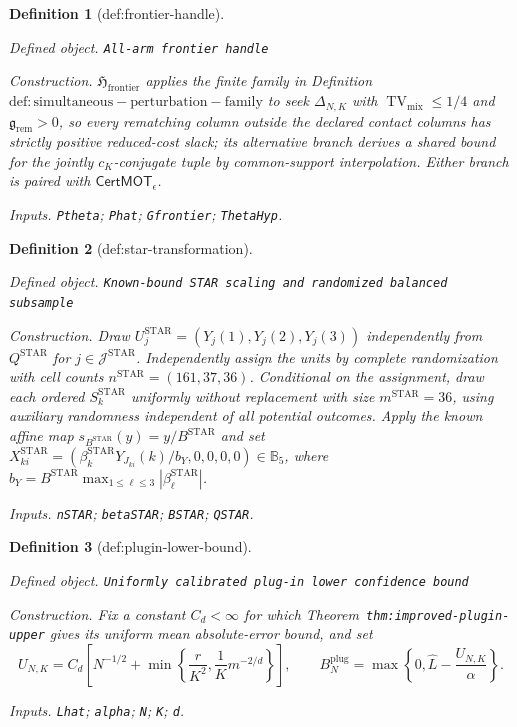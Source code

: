 \documentclass{article}
\newtheorem{definition}{Definition}
\begin{document}
\begin{definition}[def:frontier-handle]\label{def:frontier-handle}
\par\smallskip\noindent\emph{Defined object.} \texttt{All-\allowbreak{}arm frontier handle}
\par\smallskip\noindent\emph{Construction.} \(\mathfrak H_{\mathrm{frontier}}\) applies the finite family in Definition \(\mathrm{def:simultaneous-perturbation-family}\) to seek \(\Delta_{N,K}\) with \(\operatorname{TV}_{\mathrm{mix}}\le1/4\) and \(\mathfrak g_{\mathrm{rem}}>0\), so every rematching column outside the declared contact columns has strictly positive reduced-cost slack; its alternative branch derives a shared bound for the jointly \(c_K\)-conjugate tuple by common-support interpolation. Either branch is paired with \(\mathsf{CertMOT}_\epsilon\).
\par\smallskip\noindent\emph{Inputs.} \texttt{Ptheta}; \texttt{Phat}; \texttt{Gfrontier}; \texttt{ThetaHyp}.
\end{definition}

\begin{definition}[def:star-transformation]\label{def:star-transformation}
\par\smallskip\noindent\emph{Defined object.} \texttt{Known-\allowbreak{}bound STAR scaling and randomized balanced subsample}
\par\smallskip\noindent\emph{Construction.} Draw \(U_j^{\mathrm{STAR}}=(Y_j(1),Y_j(2),Y_j(3))\) independently from \(Q^{\mathrm{STAR}}\) for \(j\in\mathcal J^{\mathrm{STAR}}\). Independently assign the units by complete randomization with cell counts \(n^{\mathrm{STAR}}=(161,37,36)\). Conditional on the assignment, draw each ordered \(S_k^{\mathrm{STAR}}\) uniformly without replacement with size \(m^{\mathrm{STAR}}=36\), using auxiliary randomness independent of all potential outcomes. Apply the known affine map \(s_{B^{\mathrm{STAR}}}(y)=y/B^{\mathrm{STAR}}\) and set \(X_{ki}^{\mathrm{STAR}}=(\beta_k^{\mathrm{STAR}}Y_{J_{ki}}(k)/b_Y,0,0,0,0)\in\mathbb B_5\), where \(b_Y=B^{\mathrm{STAR}}\max_{1\le\ell\le3}|\beta_\ell^{\mathrm{STAR}}|\).
\par\smallskip\noindent\emph{Inputs.} \texttt{nSTAR}; \texttt{betaSTAR}; \texttt{BSTAR}; \texttt{QSTAR}.
\end{definition}

\begin{definition}[def:plugin-lower-bound]\label{def:plugin-lower-bound}
\par\smallskip\noindent\emph{Defined object.} \texttt{Uniformly calibrated plug-\allowbreak{}in lower confidence bound}
\par\smallskip\noindent\emph{Construction.} Fix a constant \(C_d<\infty\) for which Theorem~\texttt{thm:improved-plugin-upper} gives its uniform mean absolute-error bound, and set
\[
U_{N,K}=C_d\left[N^{-1/2}+\min\left\{\frac r{K^2},\frac1K m^{-2/d}\right\}\right],
\qquad
B_N^{\mathrm{plug}}=\max\left\{0,\widehat L-\frac{U_{N,K}}{\alpha}\right\}.
\]
\par\smallskip\noindent\emph{Inputs.} \texttt{Lhat}; \texttt{alpha}; \texttt{N}; \texttt{K}; \texttt{d}.
\end{definition}
\end{document}
